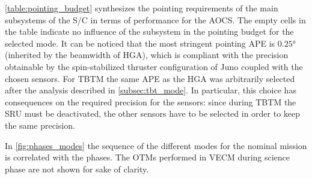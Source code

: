 \autoref{table:pointing_budget} synthesizes the pointing requirements of the main subsystems of the S/C in terms of performance for the AOCS.
The empty cells in the table indicate no influence of the subsystem in the pointing budget for the selected mode.
It can be noticed that the most stringent pointing APE is $0.25$° (inherited by the beamwidth of HGA), which is compliant with the precision obtainable by the spin-stabilized thruster configuration of Juno coupled with the chosen sensors.
For TBTM the same APE as the HGA was arbitrarily selected after the analysis described in \autoref{subsec:tbt_mode}.
In particular, this choice has consequences on the required precision for the sensors: since during TBTM the SRU must be deactivated, the other sensors have to be selected in order to keep the same precision.

In \autoref{fig:phases_modes} the sequence of the different modes for the nominal mission is correlated with the phases.
The OTMs performed in VECM during science phase are not shown for sake of clarity.

